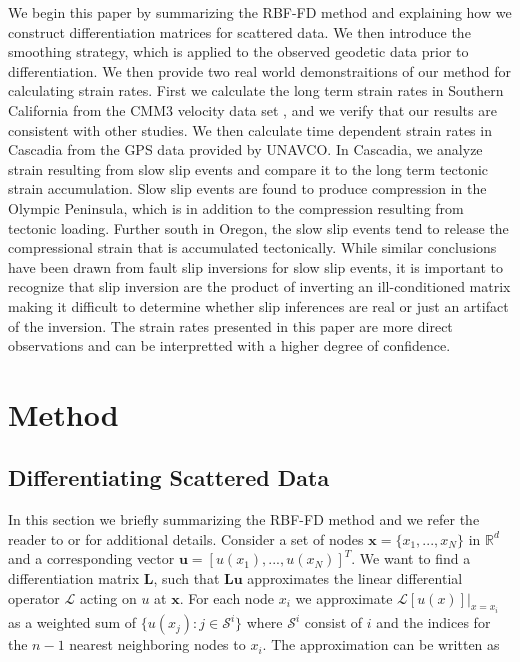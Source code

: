 \documentclass[10pt,a4paper]{article}
\begin{document}
We begin this paper by summarizing the RBF-FD method and explaining how we construct differentiation matrices for scattered data. We then introduce the smoothing strategy, which is applied to the observed geodetic data prior to differentiation.  We then provide two real world demonstraitions of our method for calculating strain rates.  First we calculate the long term strain rates in Southern California from the CMM3 velocity data set \citep{Shen2011}, and we verify that our results are consistent with other studies. We then calculate time dependent strain rates in Cascadia from the GPS data provided by UNAVCO.  In Cascadia, we analyze strain resulting from slow slip events and compare it to the long term tectonic strain accumulation. Slow slip events are found to produce compression in the Olympic Peninsula, which is in addition to the compression resulting from tectonic loading.  Further south in Oregon, the slow slip events tend to release the compressional strain that is accumulated tectonically.  While similar conclusions have been drawn from fault slip inversions for slow slip events, it is important to recognize that slip inversion are the product of inverting an ill-conditioned matrix making it difficult to determine whether slip inferences are real or just an artifact of the inversion.  The strain rates presented in this paper are more direct observations and can be interpretted with a higher degree of confidence. 

\section{Method}\label{sec:Method}
\subsection{Differentiating Scattered Data}\label{sec:Differentiating}

In this section we briefly summarizing the RBF-FD method and we refer the reader to \citet{Wright2006} or \citet{Fornberg2015} for additional details. Consider a set of nodes $\mathbf{x} = \{x_1, ..., x_N\}$ in $\mathbb{R}^d$ and a corresponding vector $\mathbf{u} = [u(x_1), ..., u(x_N)]^T$.  We want to find a differentiation matrix $\mathbf{L}$, such that $\mathbf{Lu}$ approximates the linear differential operator $\mathcal{L}$ acting on $u$ at $\mathbf{x}$.  For each node $x_i$ we approximate $\mathcal{L}[u(x)]\big|_{x=x_i}$ as a weighted sum of $\{u(x_j): j \in \mathcal{S}^i\}$ where $\mathcal{S}^i$ consist of $i$ and the indices for the $n-1$ nearest neighboring nodes to $x_i$.  The approximation can be written as
\end{document}
